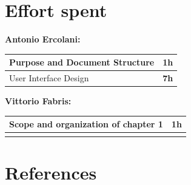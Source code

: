 \documentclass[]{article}
\begin{document}
		\newpage
		\section{Effort spent}
			
			\medskip
			\textbf{\large Antonio Ercolani:} \\ \newline
			\begin{tabular}{|l|c|}
				\hline
				Purpose and Document Structure &  \textbf{1h} \\ \hline
				\rowcolor[HTML]{DCDCDC} 
				User Interface Design & \textbf{7h} \\ \hline
				
			\end{tabular}
			\newline
			\newline
			
			\medskip
			\textbf{\large Vittorio Fabris:} \\ \newline
			\begin{tabular}{|l|c|}
				\hline
				Scope and organization of chapter 1&  \textbf{1h} \\ \hline
				\rowcolor[HTML]{DCDCDC} 
				 & \textbf{} \\ \hline
				
			\end{tabular}
	
			
			\section{References}	
			
			
	

				
\end{document}
